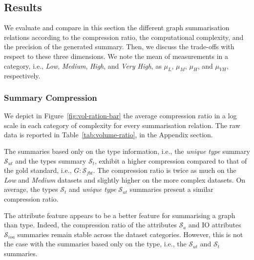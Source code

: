 

\subsection{Results}
\label{sec:eval:results}

We evaluate and compare in this section the different graph summarisation relations according to the compression ratio, the computational complexity, and the precision of the generated summary. Then, we discuss the trade-offs with respect to these three dimensions.
We note the mean of measurements in a category, i.e., \emph{Low}, \emph{Medium}, \emph{High}, and \emph{Very High}, as $\mu_{L}$, $\mu_{M}$, $\mu_{H}$, and $\mu_{VH}$, respectively.

\subsubsection{Summary Compression}

We depict in Figure~\ref{fig:vol-ration-bar} the average compression ratio in a log scale in each category of complexity for every summarisation relation. The raw data is reported in Table~\ref{tab:volume-ratio}, in the Appendix section.

The summaries based only on the type information, i.e., the \emph{unique type} summary $\mathcal{S}_{ut}$ and the types summary $\mathcal{S}_t$, exhibit a higher compression compared to that of the gold standard, i.e., $G:\mathcal{S}_{fbt}$. The compression ratio is twice as much on the \emph{Low} and \emph{Medium} datasets and slightly higher on the more complex datasets. On average, the types $\mathcal{S}_t$ and  \emph{unique type} $\mathcal{S}_{ut}$ summaries present a similar compression ratio.

The attribute feature appears to be a better feature for summarising a graph than type. Indeed, the compression ratio of the attributes  $\mathcal{S}_a$ and IO attributes $\mathcal{S}_{ioa}$ summaries remain stable across the dataset categories. However, this is not the case with the summaries based only on the type, i.e., the $\mathcal{S}_{ut}$ and $\mathcal{S}_t$ summaries.

